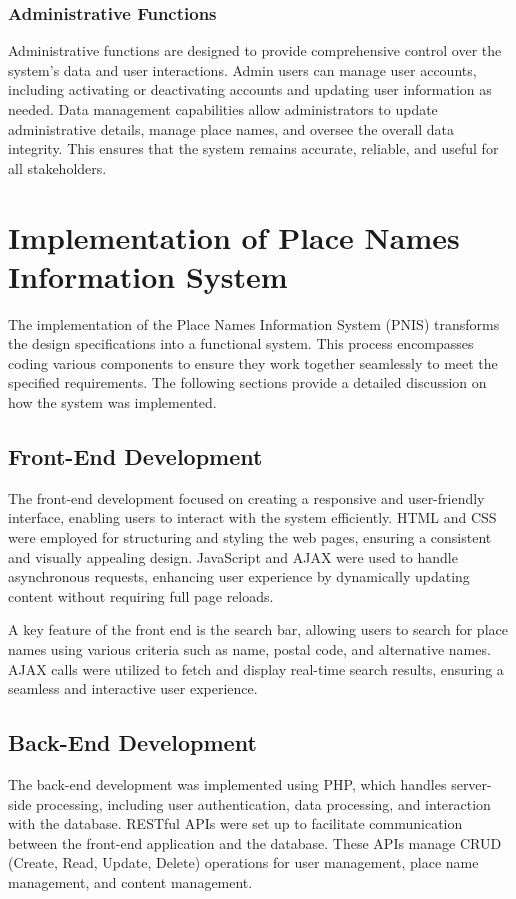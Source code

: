 \subsubsection{Administrative Functions}
Administrative functions are designed to provide comprehensive control over the system's data and user interactions. Admin users can manage user accounts, including activating or deactivating accounts and updating user information as needed. Data management capabilities allow administrators to update administrative details, manage place names, and oversee the overall data integrity. This ensures that the system remains accurate, reliable, and useful for all stakeholders.


\section{Implementation of Place Names Information System}
The implementation of the Place Names Information System (PNIS) transforms the design specifications into a functional system. This process encompasses coding various components to ensure they work together seamlessly to meet the specified requirements. The following sections provide a detailed discussion on how the system was implemented.

\subsection{Front-End Development}
The front-end development focused on creating a responsive and user-friendly interface, enabling users to interact with the system efficiently. HTML and CSS were employed for structuring and styling the web pages, ensuring a consistent and visually appealing design. JavaScript and AJAX were used to handle asynchronous requests, enhancing user experience by dynamically updating content without requiring full page reloads.

A key feature of the front end is the search bar, allowing users to search for place names using various criteria such as name, postal code, and alternative names. AJAX calls were utilized to fetch and display real-time search results, ensuring a seamless and interactive user experience.

\subsection{Back-End Development}
The back-end development was implemented using PHP, which handles server-side processing, including user authentication, data processing, and interaction with the database. RESTful APIs were set up to facilitate communication between the front-end application and the database. These APIs manage CRUD (Create, Read, Update, Delete) operations for user management, place name management, and content management.

